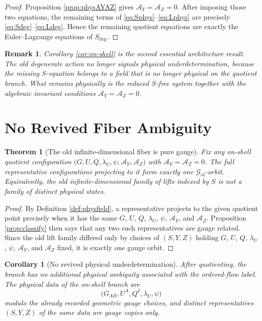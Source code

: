 \documentclass[11pt]{article}
\newcommand{\AY}{\mathcal A_Y}
\newcommand{\AZ}{\mathcal A_Z}
\newcommand{\GaugeGroup}{\mathscr G_{\mathrm{of}}}
\newtheorem{remark}{Remark}
\newtheorem{corollary}{Corollary}
\newtheorem{theorem}{Theorem}
\begin{document}
\begin{proof}
Proposition \ref{prop:physAYAZ} gives \(\AY=\AZ=0\). After imposing those two equations, the remaining terms of \eqref{eq:Sphys}--\eqref{eq:Lphys} are precisely \eqref{eq:Sdeg}--\eqref{eq:Ldeg}. Hence the remaining quotient equations are exactly the Euler--Lagrange equations of \(S_{\mathrm{deg}}\).
\end{proof}

\begin{remark}
Corollary \ref{cor:on-shell} is the second essential architecture result. The old degenerate action no longer signals physical underdetermination, because the missing \(S\)-equation belongs to a field that is no longer physical on the quotient branch. What remains physically is the reduced \(S\)-free system together with the algebraic invariant conditions \(\AY=\AZ=0\).
\end{remark}

\section{No Revived Fiber Ambiguity}

\begin{theorem}[The old infinite-dimensional fiber is pure gauge]
\label{thm:fiber}
Fix any on-shell quotient configuration \(\bigl(G,U,Q,\lambda_U,\psi,\AY,\AZ\bigr)\) with \(\AY=\AZ=0\). The full representative configurations projecting to it form exactly one \(\GaugeGroup\)-orbit. Equivalently, the old infinite-dimensional family of lifts indexed by \(S\) is not a family of distinct physical states.
\end{theorem}

\begin{proof}
By Definition \ref{def:physfield}, a representative projects to the given quotient point precisely when it has the same \(G\), \(U\), \(Q\), \(\lambda_U\), \(\psi\), \(\AY\), and \(\AZ\). Proposition \ref{prop:classify} then says that any two such representatives are gauge related. Since the old lift family differed only by choices of \((S,Y,Z)\) holding \(G\), \(U\), \(Q\), \(\lambda_U\), \(\psi\), \(\AY\), and \(\AZ\) fixed, it is exactly one gauge orbit.
\end{proof}

\begin{corollary}[No revived physical underdetermination]
\label{cor:nounder}
After quotienting, the branch has no additional physical ambiguity associated with the ordered-flow label. The physical data of the on-shell branch are
\begin{equation}
\bigl(G_{AB},U^A,Q^I,\lambda_U,\psi\bigr)
\label{eq:physicaldata}
\end{equation}
modulo the already recorded geometric gauge choices, and distinct representatives \((S,Y,Z)\) of the same data are gauge copies only.
\end{corollary}
\end{document}
